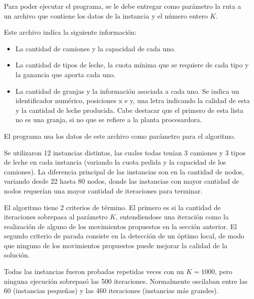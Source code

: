 Para poder ejecutar el programa, se le debe entregar como parámetro la ruta a un archivo que contiene los datos de la instancia y el número entero $K$.

Este archivo indíca la siguiente información:
\begin{itemize}
    \item La cantidad de camiones y la capacidad de cada uno.
    \item La cantidad de tipos de leche, la cuota mínima que se requiere de cada tipo y la ganancia que aporta cada uno.
    \item La cantidad de granjas y la información asociada a cada uno. Se indica un identificador numérico, posiciones x e y, una letra indicando la calidad de esta y la cantidad de leche producida. Cabe destacar que el primero de esta lista no es una granja, si no que se refiere a la planta procesardora.
\end{itemize}

El programa usa los datos de este archivo como parámetro para el algoritmo.

Se utilizaron 12 instancias distintas, las cuales todas tenían 3 camiones y 3 tipos de leche en cada instancia (variando la cuota pedida y la capacidad de los camiones). La diferencia principal de las instancias son en la cantidad de nodos, variando desde 22 hasta 80 nodos, donde las instancias con mayor cantidad de nodos requerían una mayor cantidad de iteraciones para terminar.

El algoritmo tiene 2 criterios de término. El primero es si la cantidad de iteraciones sobrepasa al parámetro $K$, entendiendose una iteración como la realización de alguno de los movimientos propuestos en la sección anterior. El segundo criterio de parada consiste en la detección de un óptimo local, de modo que ninguno de los movimientos propuestos puede mejorar la calidad de la solución.

Todas las instancias fueron probadas repetidas veces con un $K=1000$, pero ninguna ejecución sobrepasó las 500 iteraciones. Normalmente oscilaban entre las 60 (instancias pequeñas) y las 460 iteraciones (instancias más grandes).
